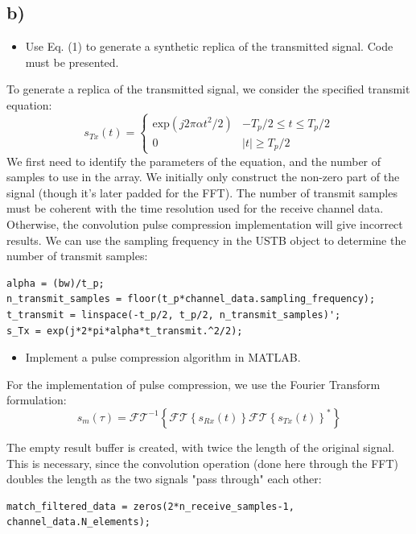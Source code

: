 \documentclass{article}
\begin{document}
\subsection*{b)}

\begin{itemize}
    \item Use Eq. (1) to generate a synthetic replica of the transmitted signal. Code must be presented.
\end{itemize}
To generate a replica of the transmitted signal, we consider the specified transmit equation:
\[ s_{Tx}(t) = \begin{cases} 
      \text{exp}(j2\pi\alpha t^2/2) & -T_p/2 \leq t \leq T_p/2 \\
      0 & |t| \ge T_p/2
   \end{cases}
\]
We first need to identify the parameters of the equation, and the number of samples to use in the array.
We initially only construct the non-zero part of the signal (though it's later padded for the FFT).
The number of transmit samples must be coherent with the time resolution used for the receive channel data. 
Otherwise, the convolution pulse compression implementation will give incorrect results. We 
can use the sampling frequency in the USTB object to determine the number of transmit samples:

\begin{lstlisting}[style=MatlabStyle]
alpha = (bw)/t_p;
n_transmit_samples = floor(t_p*channel_data.sampling_frequency);
t_transmit = linspace(-t_p/2, t_p/2, n_transmit_samples)';
s_Tx = exp(j*2*pi*alpha*t_transmit.^2/2);
\end{lstlisting}

\newpage
\begin{itemize}
    \item Implement a pulse compression algorithm in MATLAB.
\end{itemize}

\noindent For the implementation of pulse compression, we use the Fourier Transform formulation:
\[s_m(\tau) = \mathcal{FT}^{-1}\left\{\mathcal{FT}\left\{s_{Rx}(t)\right\}\mathcal{FT}\left\{s_{Tx}(t)\right\}^* \right\} \]

\noindent The empty result buffer is created, with twice the length of the original signal. This is necessary, since
the convolution operation (done here through the FFT) doubles the length as the two signals "pass through" each other:

\lstset{language=Matlab}
\begin{lstlisting}[style=MatlabStyle]
match_filtered_data = zeros(2*n_receive_samples-1, channel_data.N_elements);
\end{lstlisting}
\end{document}
